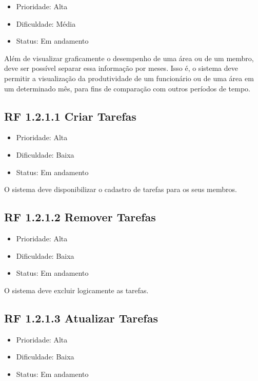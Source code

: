 \begin{apendicesenv}
\begin{itemize}
  \item{Prioridade: Alta}
  \item{Dificuldade: Média}
  \item{Status: Em andamento}
\end{itemize}

Além de visualizar graficamente o desempenho de uma área ou de um membro, deve ser possível separar essa informação por meses. Isso é, o sistema deve permitir a visualização da produtividade de um funcionário ou de uma área em um determinado mês, para fins de comparação com outros períodos de tempo.


\subsection{RF 1.2.1.1 Criar Tarefas}

\begin{itemize}
  \item{Prioridade: Alta}
  \item{Dificuldade: Baixa}
  \item{Status: Em andamento}
\end{itemize}

O sistema deve disponibilizar o cadastro de tarefas para os seus membros.


\subsection{RF 1.2.1.2 Remover Tarefas}

\begin{itemize}
  \item{Prioridade: Alta}
  \item{Dificuldade: Baixa}
  \item{Status: Em andamento}
\end{itemize}

O sistema deve excluir logicamente as tarefas.


\subsection{RF 1.2.1.3 Atualizar Tarefas}

\begin{itemize}
  \item{Prioridade: Alta}
  \item{Dificuldade: Baixa}
  \item{Status: Em andamento}
\end{itemize}


\end{apendicesenv}
